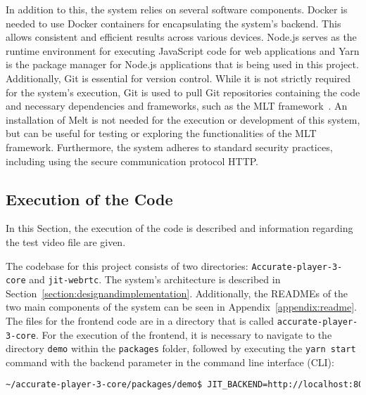 \documentclass[../MasterThesis.tex]{subfiles}
\begin{document}
In addition to this, the system relies on several software components.
Docker is needed to use Docker containers for encapsulating the system's backend. This allows consistent and efficient results across various devices.
Node.js serves as the runtime environment for executing JavaScript code for web applications and Yarn is the package manager for Node.js applications that is being used in this project.
Additionally, Git is essential for version control. While it is not strictly required for the system's execution, Git is used to pull Git repositories containing the code and necessary dependencies and frameworks, such as the MLT framework~\cite{git}. 
An installation of Melt is not needed for the execution or development of this system, but can be useful for testing or exploring the functionalities of the MLT framework.
%
Furthermore, the system adheres to standard security practices, including using the secure communication protocol HTTP.


	
	
	
	
	
	








\subsection{Execution of the Code} \label{subsection:runninghtecode}

In this Section, the execution of the code is described and information regarding the test video file are given.

The codebase for this project consists of two directories: \texttt{Accurate-player-3-core} and \texttt{jit-webrtc}. The system's architecture is described in Section~\ref{section:designandimplementation}. Additionally, the READMEs of the two main components of the system can be seen in Appendix~\ref{appendix:readme}.
%
The files for the frontend code are in a directory that is called \texttt{accurate-player-3-core}. 
For the execution of the frontend, it is necessary to navigate to the directory \texttt{demo} within the \texttt{packages} folder, followed by executing the \texttt{yarn start} command with the backend parameter in the command line interface (CLI):
\begin{lstlisting}[language=bash, numbers=none, columns=fullflexible]
	~/accurate-player-3-core/packages/demo$ JIT_BACKEND=http://localhost:8080 yarn start
\end{lstlisting}
\end{document}
